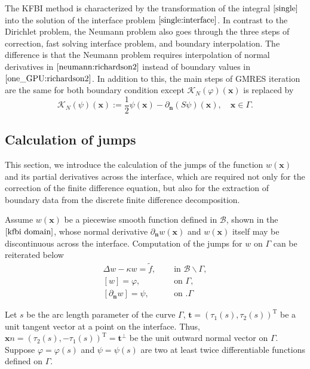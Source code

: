 The KFBI method is characterized by the transformation of the integral  $\eqref{single}$  into the solution of the interface problem $\eqref{single:interface}$. In contrast to the Dirichlet problem, the Neumann problem also goes through the three steps of correction, fast solving interface problem, and boundary interpolation. The difference is that the Neumann problem requires interpolation of normal derivatives in $\eqref{neumann:richardson2}$ instead of boundary values in $\eqref{one_GPU:richardson2}$. In addition to this, the main steps of GMRES iteration are the same for both boundary condition except $\mathcal{K}_{N}(\varphi)(\mathbf{x})$ is replaced by 
\begin{equation}
    \mathcal{K}_{N}(\psi)(\mathbf{x}) := \frac{1}{2}\psi(\mathbf{x}) - \partial_{\mathbf{n}}(S\psi)(\mathbf{x}), \quad \mathbf{x} \in \Gamma.
\end{equation}
\iffalse
\subsection{Calculation of jumps}\label{appen:jumps}
This section, we introduce the calculation of the jumps of the function $w(\mathbf{x})$ and its partial derivatives across the interface, 
 which are required not only for the correction of the finite difference equation, but also for the extraction of boundary data from the discrete finite difference decomposition.
 
Assume $w(\mathbf{x})$ be a piecewise smooth function defined in $\mathcal{B}$, shown in the $\ref{kfbi domain}$, whose normal derivative $\partial_{\mathbf{n}} w(\mathbf{x})$ and $w(\mathbf{x})$ itself may be discontinuous across the interface. Computation of the jumps for $w$ on $\Gamma$ can be reiterated below
\begin{align}
\Delta w- \kappa w =\tilde{f}, & \quad \text { in }  \mathcal{B} \backslash \Gamma \label{jump::1},\\
[w] =\varphi, & \quad \text { on } \Gamma \label{jump::2},\\
\left[\partial_{\mathbf{n}}w\right] =\psi, & \quad \text { on } \label{jump::3}.\Gamma
\end{align}
\label{interface2}

Let $s$ be the arc length parameter of the curve $\Gamma$, $\mathbf{t}=(\tau_{1}(s), \tau_{2}(s))^{\mathrm{T}}$ be a unit tangent vector at a point on the interface. Thus, $\mathbf{x}{n}=\left(\tau_{2}(s),-\tau_{1}(s)\right)^{\mathrm{T}}=\mathbf{t}^{\perp}$ be the unit outward normal vector on $\Gamma$. Suppose $\varphi = \varphi(s)$ and $\psi = \psi(s)$ are two at least twice differentiable functions defined on $\Gamma$.

